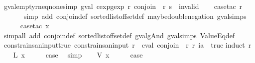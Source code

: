 \begin{isabellebody}
\ gval{\isacharunderscore}empty{\isacharunderscore}r{\isacharunderscore}neq{\isacharunderscore}none{\isacharbrackleft}simp{\isacharbrackright}{\isacharcolon}\ {\isachardoublequoteopen}gval\ {\isacharparenleft}cexp{}gexp\ r\ {\isacharparenleft}conjoin\ {\isacharparenleft}{\isasymlbrakk}{\isasymrbrakk}\ r{\isacharparenright}{\isacharparenright}{\isacharparenright}\ s\ {\isasymnoteq}\ invalid{\isachardoublequoteclose}\isanewline
%
\isadelimproof
\ \ %
\endisadelimproof
%
\isatagproof
{}\isamarkupfalse%
\ {\isacharparenleft}case{\isacharunderscore}tac\ r{\isacharparenright}\isanewline
\ \ \ \ \ \isamarkupfalse%
\ {\isacharparenleft}simp\ add{\isacharcolon}\ conjoin{\isacharunderscore}def\ sorted{\isacharunderscore}list{\isacharunderscore}of{\isacharunderscore}fset{\isacharunderscore}def\ maybe{\isacharunderscore}double{\isacharunderscore}negation\ gval{\isachardot}simps{\isacharparenright}\isanewline
\ \ \ \ \isamarkupfalse%
\ {\isacharparenleft}case{\isacharunderscore}tac\ x{}{\isacharparenright}\isanewline
\ \ \isamarkupfalse%
\ {\isacharparenleft}simp{\isacharunderscore}all\ add{\isacharcolon}\ conjoin{\isacharunderscore}def\ sorted{\isacharunderscore}list{\isacharunderscore}of{\isacharunderscore}fset{\isacharunderscore}def\ gval{\isacharunderscore}gAnd\ gval{\isachardot}simps\ ValueEq{\isacharunderscore}def{\isacharparenright}%
\endisatagproof
{\isafoldproof}%
%
\isadelimproof
\isanewline
%
\endisadelimproof
\isanewline
{}\isamarkupfalse%
\ constrains{\isacharunderscore}an{\isacharunderscore}input{\isacharunderscore}true{\isacharcolon}\ {\isachardoublequoteopen}constrains{\isacharunderscore}an{\isacharunderscore}input\ r\ {\isasymLongrightarrow}\ cval\ {\isacharparenleft}conjoin\ {\isacharparenleft}{\isasymlbrakk}{\isasymrbrakk}\ r{\isacharparenright}{\isacharparenright}\ r\ ia\ {\isacharequal}\ true{\isachardoublequoteclose}\isanewline
%
\isadelimproof
%
\endisadelimproof
%
\isatagproof
{}\isamarkupfalse%
{\isacharparenleft}induct\ r{\isacharparenright}\isanewline
\ \ \isamarkupfalse%
\ {\isacharparenleft}L\ x{\isacharparenright}\isanewline
\ \ \isamarkupfalse%
\ \isamarkupfalse%
\ {\isacharquery}case\ \isamarkupfalse%
\ simp\isanewline
{}\isamarkupfalse%
\isanewline
\ \ \isamarkupfalse%
\ {\isacharparenleft}V\ x{\isacharparenright}\isanewline
\ \ \isamarkupfalse%
\ \isamarkupfalse%
\ {\isacharquery}case\isanewline

\end{isabellebody}

